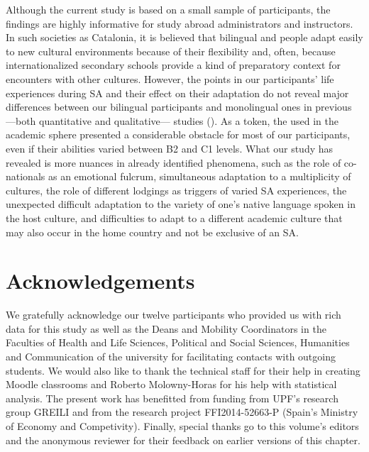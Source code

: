 \documentclass[output=paper]{langsci/langscibook}
\begin{document}
Although the current study is based on a small sample of participants, the findings are highly informative for study abroad administrators and instructors. In such societies as Catalonia, it is believed that bilingual and  people adapt easily to new cultural environments because of their  flexibility and, often, because internationalized secondary schools provide a kind of preparatory context for encounters with other cultures. However, the  points in our participants’ life experiences during SA and their effect on their  adaptation do not reveal major differences between our bilingual  participants and monolingual ones in previous —both quantitative and qualitative— studies (\citealt{Williams2005,VandeBergEtAl2009,Beaven2012}). As a token, the  used in the academic sphere presented a considerable obstacle for most of our participants, even if their  abilities varied between B2 and C1 levels. What our study has revealed is more nuances in already identified phenomena, such as the role of co-nationals as an emotional fulcrum, simultaneous adaptation to a multiplicity of cultures, the role of different lodgings as triggers of varied SA experiences, the unexpected difficult adaptation to the variety of one’s native language spoken in the host culture, and difficulties to adapt to a different academic culture that may also occur in the home country and not be exclusive of an SA.

\section*{Acknowledgements}

We gratefully acknowledge our twelve participants who provided us with rich data for this study as well as the Deans and Mobility Coordinators in the Faculties of Health and Life Sciences, Political and Social Sciences, Humanities and Communication of the  university for facilitating contacts with outgoing students. We would also like to thank the technical staff for their help in creating Moodle classrooms and Roberto Molowny-Horas for his help with statistical analysis. The present work has benefitted from funding from UPF’s research group GREILI and from the research project {FFI2014-52663-P}{ }{(Spain’s} Ministry of Economy and Competivity){. }Finally, special thanks go to this volume’s editors and the anonymous reviewer for their feedback on earlier versions of this chapter. 
 
\sloppy
\printbibliography[heading=subbibliography,notkeyword=this] 
\end{document}
